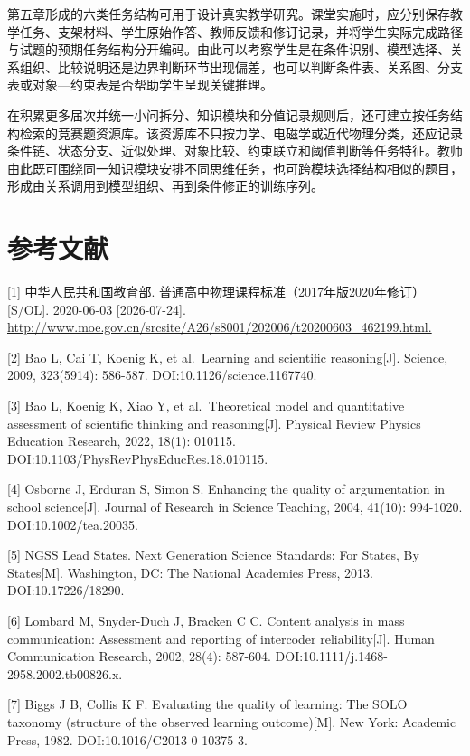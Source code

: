 \documentclass[
  12pt,
  a4paper,twoside,openany]{ctexbook}
\begin{document}
第五章形成的六类任务结构可用于设计真实教学研究。课堂实施时，应分别保存教学任务、支架材料、学生原始作答、教师反馈和修订记录，并将学生实际完成路径与试题的预期任务结构分开编码。由此可以考察学生是在条件识别、模型选择、关系组织、比较说明还是边界判断环节出现偏差，也可以判断条件表、关系图、分支表或对象---约束表是否帮助学生呈现关键推理。

在积累更多届次并统一小问拆分、知识模块和分值记录规则后，还可建立按任务结构检索的竞赛题资源库。该资源库不只按力学、电磁学或近代物理分类，还应记录条件链、状态分支、近似处理、对象比较、约束联立和阈值判断等任务特征。教师由此既可围绕同一知识模块安排不同思维任务，也可跨模块选择结构相似的题目，形成由关系调用到模型组织、再到条件修正的训练序列。

\chapter*{参考文献}\begingroup\setlength{\leftskip}{2em}\setlength{\parindent}{-2em}\setlength{\parskip}{3pt}\label{ux53c2ux8003ux6587ux732e}

{[}1{]} 中华人民共和国教育部.
普通高中物理课程标准（2017年版2020年修订）{[}S/OL{]}. 2020-06-03
{[}2026-07-24{]}.
\url{http://www.moe.gov.cn/srcsite/A26/s8001/202006/t20200603_462199.html.}

{[}2{]} Bao L, Cai T, Koenig K, et al.~Learning and scientific
reasoning{[}J{]}. Science, 2009, 323(5914): 586-587.
DOI:10.1126/science.1167740.

{[}3{]} Bao L, Koenig K, Xiao Y, et al.~Theoretical model and
quantitative assessment of scientific thinking and reasoning{[}J{]}.
Physical Review Physics Education Research, 2022, 18(1): 010115.
DOI:10.1103/PhysRevPhysEducRes.18.010115.

{[}4{]} Osborne J, Erduran S, Simon S. Enhancing the quality of
argumentation in school science{[}J{]}. Journal of Research in Science
Teaching, 2004, 41(10): 994-1020. DOI:10.1002/tea.20035.

{[}5{]} NGSS Lead States. Next Generation Science Standards: For States,
By States{[}M{]}. Washington, DC: The National Academies Press, 2013.
DOI:10.17226/18290.

{[}6{]} Lombard M, Snyder-Duch J, Bracken C C. Content analysis in mass
communication: Assessment and reporting of intercoder
reliability{[}J{]}. Human Communication Research, 2002, 28(4): 587-604.
DOI:10.1111/j.1468-2958.2002.tb00826.x.

{[}7{]} Biggs J B, Collis K F. Evaluating the quality of learning: The
SOLO taxonomy (structure of the observed learning outcome){[}M{]}. New
York: Academic Press, 1982. DOI:10.1016/C2013-0-10375-3.
\end{document}
